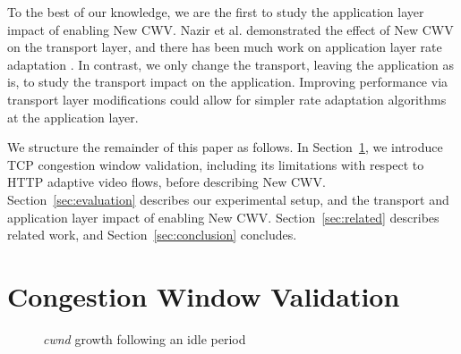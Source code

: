 \documentclass[10pt,sigconf]{acmart}
\begin{document}
To the best of our knowledge, we are the first to study the application
layer impact of enabling New CWV. 
Nazir et al. \cite{Nazir-2014-performance-evaluation-congestion-window-validation-dash-newcwv}
demonstrated the effect of New CWV on the transport layer, and there has been much work on application layer rate adaptation \cite{Mok-2012-qdash,Huang-2015-A-buffer-based-approach-to-rate-adaptation-bba, Yin-2015-a-control-theoritic-approach}. In contrast, we only change the transport, leaving the application as is, to study the transport impact on the application. Improving performance via transport layer modifications could allow for simpler rate adaptation algorithms at the application layer.


We structure the remainder of this paper as follows. In Section~\ref{sec:background}, we introduce TCP congestion window validation, including its limitations with respect to HTTP adaptive video flows, before describing New CWV. Section~\ref{sec:evaluation} describes our experimental setup, and the transport and application layer impact of enabling New CWV. Section~\ref{sec:related} describes related work, and Section~\ref{sec:conclusion} concludes.

\section{Congestion Window Validation}
\label{sec:background}

\begin{figure}
  \centering
    \caption{\emph{cwnd} growth following an idle period}
    \label{fig:cwnd-growth-after-idle}
\end{figure}
\end{document}
